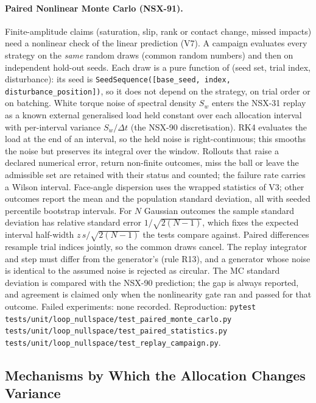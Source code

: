 \documentclass[11pt,a4paper]{article}
\begin{document}
\paragraph{Paired Nonlinear Monte Carlo (NSX-91).}  Finite-amplitude claims
(saturation, slip, rank or contact change, missed impacts) need a nonlinear
check of the linear prediction (V7).  A campaign evaluates every strategy on the
\emph{same} random draws (common random numbers) and then on independent
hold-out seeds.  Each draw is a pure function of (seed set, trial index,
disturbance): its seed is
\texttt{SeedSequence([base\_seed, index, disturbance\_position])}, so it does not
depend on the strategy, on trial order or on batching.  White torque noise of
spectral density $S_w$ enters the NSX-31 replay as a known external generalised
load held constant over each allocation interval with per-interval variance
$S_w/\Delta t$ (the NSX-90 discretisation).  RK4 evaluates the load at the end of
an interval, so the held noise is right-continuous; this smooths the noise but
preserves its integral over the window.  Rollouts that raise a declared numerical
error, return non-finite outcomes, miss the ball or leave the admissible set are
retained with their status and counted; the failure rate carries a Wilson
interval.  Face-angle dispersion uses the wrapped statistics of V3; other
outcomes report the mean and the population standard deviation, all with seeded
percentile bootstrap intervals.  For $N$ Gaussian outcomes the sample standard
deviation has relative standard error $1/\sqrt{2(N-1)}$, which fixes the
expected interval half-width $z\,s/\sqrt{2(N-1)}$ the tests compare against.
Paired differences resample trial indices jointly, so the common draws cancel.
The replay integrator and step must differ from the generator's (rule R13), and
a generator whose noise is identical to the assumed noise is rejected as
circular.  The MC standard deviation is compared with the NSX-90 prediction; the
gap is always reported, and agreement is claimed only when the nonlinearity gate
ran and passed for that outcome.  Failed experiments: none recorded.
Reproduction: \texttt{pytest tests/unit/loop\_nullspace/test\_paired\_monte\_carlo.py
tests/unit/loop\_nullspace/test\_paired\_statistics.py
tests/unit/loop\_nullspace/test\_replay\_campaign.py}.

\subsection{Mechanisms by Which the Allocation Changes Variance}
\label{sec:var-mechanisms}
\end{document}
